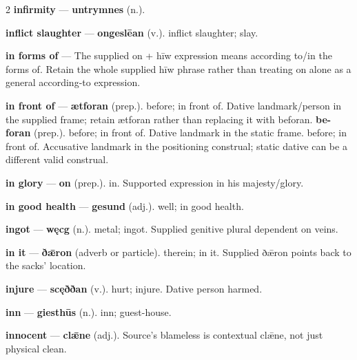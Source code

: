 \begin{multicols}{2}
\textbf{infirmity} — \textbf{untrymnes} (n.).\par
\textbf{inflict slaughter} — \textbf{ongeslēan} (v.). inflict slaughter; slay.\par
\textbf{in forms of} — The supplied on + hīw expression means according to/in the forms of. Retain the whole supplied hīw phrase rather than treating on alone as a general according-to expression.\par
\textbf{in front of} — \textbf{ætforan} (prep.). before; in front of. Dative landmark/person in the supplied frame; retain ætforan rather than replacing it with beforan. \textbf{be-foran} (prep.). before; in front of. Dative landmark in the static frame. before; in front of. Accusative landmark in the positioning construal; static dative can be a different valid construal.\par
\textbf{in glory} — \textbf{on} (prep.). in. Supported expression in his majesty/glory.\par
\textbf{in good health} — \textbf{gesund} (adj.). well; in good health.\par
\textbf{ingot} — \textbf{węcg} (n.). metal; ingot. Supplied genitive plural dependent on veins.\par
\textbf{in it} — \textbf{ðǣron} (adverb or particle). therein; in it. Supplied ðǣron points back to the sacks' location.\par
\textbf{injure} — \textbf{scęððan} (v.). hurt; injure. Dative person harmed.\par
\textbf{inn} — \textbf{giesthūs} (n.). inn; guest-house.\par
\textbf{innocent} — \textbf{clǣne} (adj.). Source's blameless is contextual clǣne, not just physical clean.\par

\end{multicols}
